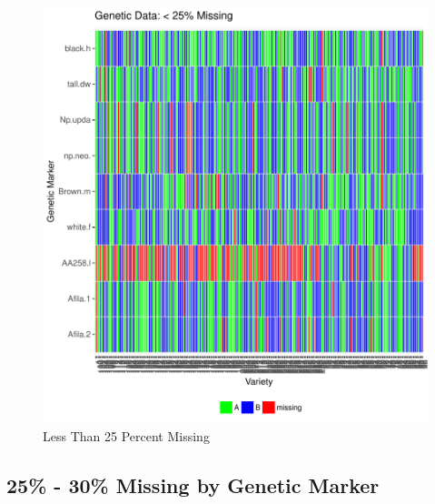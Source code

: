\documentclass[11pt]{article}\usepackage[]{graphicx}\usepackage[]{color}
\makeatletter
\def\maxwidth{ %
  \ifdim\Gin@nat@width>\linewidth
    \linewidth
  \else
    \Gin@nat@width
  \fi
}
\newenvironment{knitrout}{}{} %
\makeatother
\begin{document}
\begin{knitrout}\footnotesize
{}\color{fgcolor}\begin{figure}[H]

{\centering \includegraphics[width=\maxwidth]{figure/missing_plot25-1} 

}

\caption[Less Than 25 Percent Missing]{Less Than 25 Percent Missing}\label{fig:missing.plot25}
\end{figure}


\end{knitrout}

\newpage

\subsection{25\% - 30\% Missing by Genetic Marker}
\end{document}
